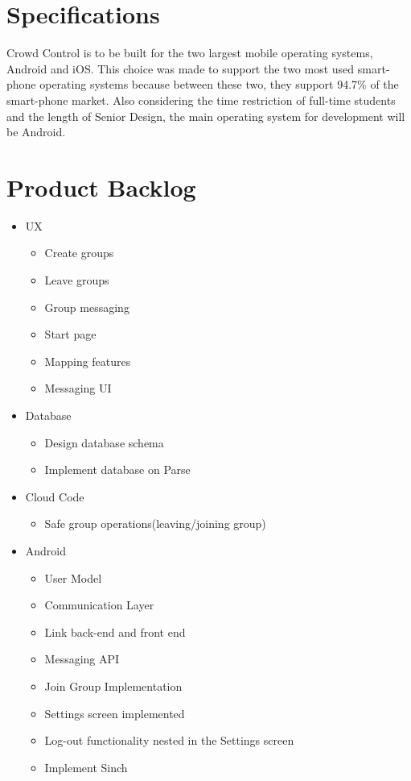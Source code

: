 \section{Specifications}  
Crowd Control is to be built for the two largest mobile operating systems, Android and iOS.  This choice was made to support the two most used smart-phone operating systems because between these two, they support 94.7\% of the smart-phone market.  Also considering the time restriction of full-time students and the length of Senior Design, the main operating system for development will be Android.

\section{Product Backlog}
\begin{itemize}
\item UX
\begin{itemize}
	\item Create groups
	\item Leave groups
	\item Group messaging
	\item Start page
	\item Mapping features
	\item Messaging UI
\end{itemize}
\item Database
\begin{itemize}
	\item Design database schema
	\item Implement database on Parse
\end{itemize}
\item Cloud Code
\begin{itemize}
	\item Safe group operations(leaving/joining group)
\end{itemize}
\item Android
\begin{itemize}
	\item User Model
	\item Communication Layer
	\item Link back-end and front end
	\item Messaging API
	\item Join Group Implementation
	\item Settings screen implemented
	\item Log-out functionality nested in the Settings screen
	\item Implement Sinch

\end{itemize}
\end{itemize}
